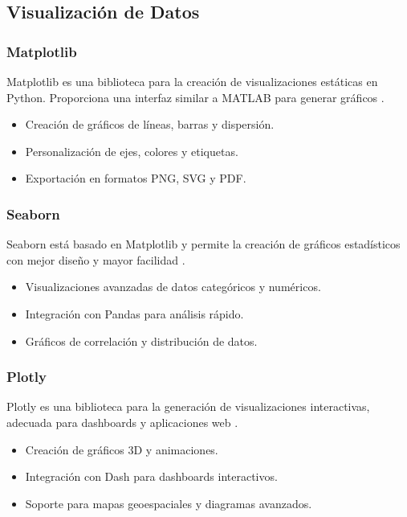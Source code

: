 \subsection{Visualización de Datos}

\subsubsection{Matplotlib}
Matplotlib es una biblioteca para la creación de visualizaciones estáticas en Python. Proporciona una interfaz similar a MATLAB para generar gráficos \cite{hunter2007matplotlib}.

\begin{itemize}
	\item Creación de gráficos de líneas, barras y dispersión.
	\item Personalización de ejes, colores y etiquetas.
	\item Exportación en formatos PNG, SVG y PDF.
\end{itemize}

\subsubsection{Seaborn}
Seaborn está basado en Matplotlib y permite la creación de gráficos estadísticos con mejor diseño y mayor facilidad \cite{waskom2021seaborn}.

\begin{itemize}
	\item Visualizaciones avanzadas de datos categóricos y numéricos.
	\item Integración con Pandas para análisis rápido.
	\item Gráficos de correlación y distribución de datos.
\end{itemize}

\subsubsection{Plotly}
Plotly es una biblioteca para la generación de visualizaciones interactivas, adecuada para dashboards y aplicaciones web \cite{plotly2021}.

\begin{itemize}
	\item Creación de gráficos 3D y animaciones.
	\item Integración con Dash para dashboards interactivos.
	\item Soporte para mapas geoespaciales y diagramas avanzados.
\end{itemize}


